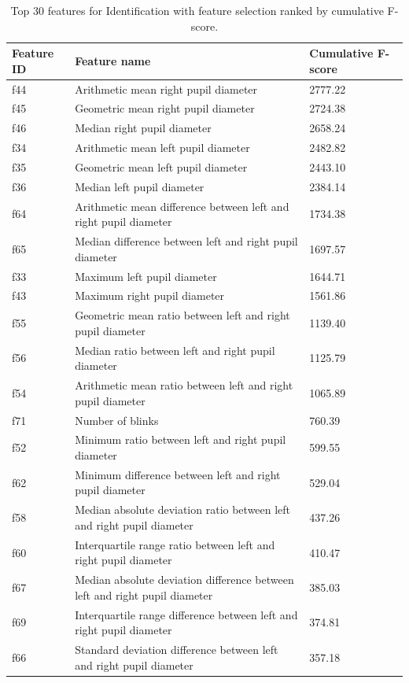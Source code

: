 \documentclass[12pt]{report}
\begin{document}
\begin{table}[htbp]
\centering
\scriptsize
\setlength{\tabcolsep}{3pt}
\caption{Top 30 features for Identification with feature selection ranked by cumulative F-score.}
\label{tab:top30_id}
\begin{tabular}{lll}
\toprule
\textbf{Feature ID} & \textbf{Feature name} & \textbf{Cumulative F-score} \\
\midrule
f44 & Arithmetic mean right pupil diameter & 2777.22 \\
f45 & Geometric mean right pupil diameter & 2724.38 \\
f46 & Median right pupil diameter & 2658.24 \\
f34 & Arithmetic mean left pupil diameter & 2482.82 \\
f35 & Geometric mean left pupil diameter & 2443.10 \\
f36 & Median left pupil diameter & 2384.14 \\
f64 & Arithmetic mean difference between left and right pupil diameter & 1734.38 \\
f65 & Median difference between left and right pupil diameter & 1697.57 \\
f33 & Maximum left pupil diameter & 1644.71 \\
f43 & Maximum right pupil diameter & 1561.86 \\
f55 & Geometric mean ratio between left and right pupil diameter & 1139.40 \\
f56 & Median ratio between left and right pupil diameter & 1125.79 \\
f54 & Arithmetic mean ratio between left and right pupil diameter & 1065.89 \\
f71 & Number of blinks & 760.39 \\
f52 & Minimum ratio between left and right pupil diameter & 599.55 \\
f62 & Minimum difference between left and right pupil diameter & 529.04 \\
f58 & Median absolute deviation ratio between left and right pupil diameter & 437.26 \\
f60 & Interquartile range ratio between left and right pupil diameter & 410.47 \\
f67 & Median absolute deviation difference between left and right pupil diameter & 385.03 \\
f69 & Interquartile range difference between left and right pupil diameter & 374.81 \\
f66 & Standard deviation difference between left and right pupil diameter & 357.18 \\

\end{tabular}
\end{table}
\end{document}
